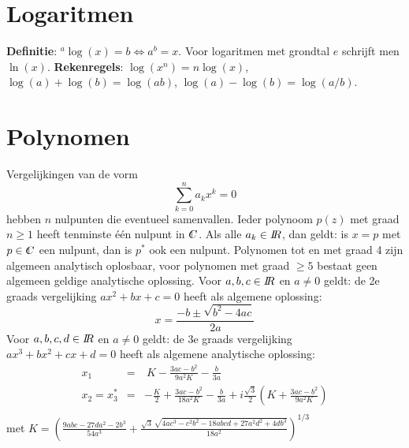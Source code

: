 \section{Logaritmen}
{\bf Definitie}: $^a\log(x)=b\Leftrightarrow a^b=x$. Voor logaritmen met
grondtal $e$ schrijft men $\ln(x)$.
\npar
{\bf Rekenregels}: $\log(x^n)=n\log(x)$, $\log(a)+\log(b)=\log(ab)$,
$\log(a)-\log(b)=\log(a/b)$.

\section{Polynomen}
Vergelijkingen van de vorm
\[
\sum_{k=0}^n a_kx^k=0
\]
hebben $n$ nulpunten die eventueel samenvallen. Ieder polynoom $p(z)$ met
graad $n\geq1$ heeft tenminste \'e\'en nulpunt in $\CC$.
Als alle $a_k\in I\hspace{-1mm}R$, dan geldt: is $x=p$ met $p\in\CC$ een nulpunt, dan is
$p^*$ ook een nulpunt. Polynomen tot en met graad 4 zijn algemeen analytisch
oplosbaar, voor polynomen met graad $\geq5$ bestaat geen algemeen geldige
analytische oplossing.
\npar
Voor $a,b,c\in I\hspace{-1mm}R$ en $a\neq0$ geldt:
de 2e graads vergelijking $ax^2+bx+c=0$ heeft als algemene oplossing:
\[
x=\frac{-b\pm\sqrt{b^2-4ac}}{2a}
\]
Voor $a,b,c,d\in I\hspace{-1mm}R$ en $a\neq0$ geldt:
de 3e graads vergelijking $ax^3+bx^2+cx+d=0$ heeft als algemene analytische
oplossing:
\begin{eqnarray*}
x_1&=&~K-\frac{3ac-b^2}{9a^2K}-\frac{b}{3a}\\
x_2=x_3^*&=&-\frac{K}{2}+\frac{3ac-b^2}{18a^2K}-\frac{b}{3a}+i\frac{\sqrt{3}}{2}\left(K+\frac{3ac-b^2}{9a^2K}\right)\\
\end{eqnarray*}
met $\displaystyle K=\left(\frac{9abc-27da^2-2b^3}{54a^3}+
\frac{\sqrt{3}\,\sqrt{4ac^3-c^2b^2-18abcd+27a^2d^2+4db^3}}{18a^2}\right)^{1/3}$

